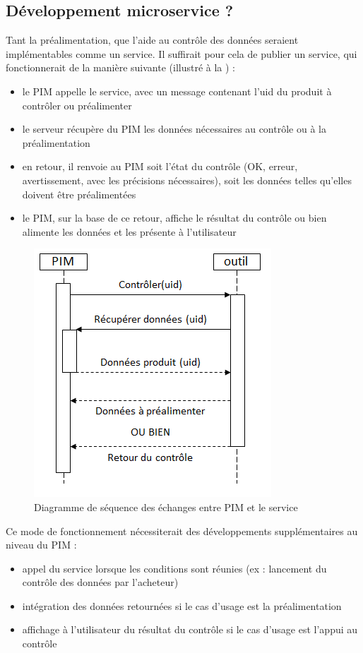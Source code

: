             \subsection{Développement microservice ?}

            Tant la préalimentation, que l'aide au contrôle des données seraient implémentables comme un service.
            Il suffirait pour cela de publier un service, qui fonctionnerait de la manière suivante (illustré à la ) : 
            \begin{itemize}
                \item le PIM appelle le service, avec un message contenant l'uid du produit à contrôler ou préalimenter
                \item le serveur récupère du PIM les données nécessaires au contrôle ou à la préalimentation
                \item en retour, il renvoie au PIM soit l'état du contrôle (OK, erreur, avertissement, avec les précisions nécessaires), soit les données telles qu'elles doivent être préalimentées
                \item le PIM, sur la base de ce retour, affiche le résultat du contrôle ou bien alimente les données et les présente à l'utilisateur
            \end{itemize}

            \begin{figure}[htbp]
                \begin{center}
                \includegraphics[width=0.4\linewidth]{img/sequence_diag.png}
                \end{center}
                \caption{Diagramme de séquence des échanges entre PIM et le service}
                \label{fig:sequence_diag}
            \end{figure}

            Ce mode de fonctionnement nécessiterait des développements supplémentaires au niveau du PIM : 
            \begin{itemize}
                \item appel du service lorsque les conditions sont réunies (ex : lancement du contrôle des données par l'acheteur)
                \item intégration des données retournées si le cas d'usage est la préalimentation
                \item affichage à l'utilisateur du résultat du contrôle si le cas d'usage est l'appui au contrôle
            \end{itemize}

